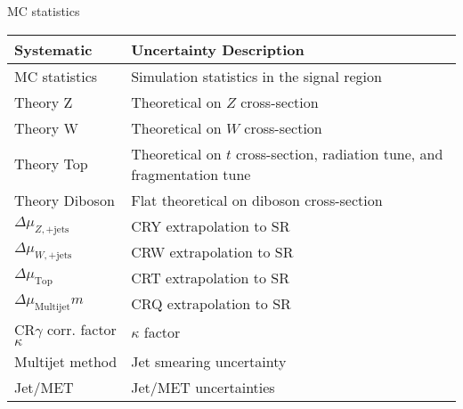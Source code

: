 MC statistics
\begin{table}[tbp]
\scriptsize
\begin{center}
\begin{tabular}{| l | l |}
\hline
Systematic                        & Uncertainty Description                                                   \\
\hline\hline
MC statistics                     & Simulation statistics in the signal region                                \\ \hline
Theory Z                          & Theoretical  on $Z$ cross-section                                         \\ \hline
Theory W                          & Theoretical  on $W$ cross-section                                         \\ \hline
Theory Top                        & Theoretical  on $t$ cross-section, radiation tune, and fragmentation tune \\ \hline
Theory Diboson                    & Flat theoretical on diboson cross-section                                 \\ \hline
$\Delta\mu_{Z,\mathrm{+jets}}$    & CRY extrapolation to SR                                                   \\ \hline
$\Delta\mu_{W,\mathrm{+jets}}$    & CRW extrapolation to SR                                                   \\ \hline
$\Delta\mu_{\mathrm{ Top}}$       & CRT extrapolation to SR                                                   \\ \hline
$\Delta\mu_{\mathrm{ Multijet}}m$ & CRQ extrapolation to SR                                                   \\ \hline
CR$\gamma$ corr. factor $\kappa$  & $\kappa$ factor                                                           \\ \hline
Multijet method                   & Jet smearing uncertainty                                                  \\ \hline
Jet/MET                           & Jet/MET uncertainties                                                     \\ \hline

\end{tabular}
\end{center}
\end{table}
